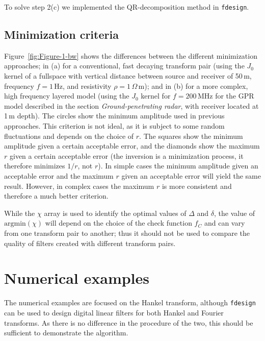 \documentclass[paper,twocolumn,twoside]{geophysics}
\newcommand{\mr}[1]{\mathrm{#1}}
\begin{document}
To solve step 2(c) we implemented the QR-decomposition method in
  \texttt{fdesign}.

\subsection{Minimization criteria}
Figure~\ref{fig:Figure-1-bw} shows the differences between the different
minimization approaches; in (a) for a conventional, fast decaying transform
pair (using the $J_0$ kernel of a fullspace with vertical distance between
source and receiver of 50\,m, frequency $f=1\,$Hz, and resistivity
$\rho=1\,\Omega\,$m); and in (b) for a more complex, high frequency layered
model (using the $J_0$ kernel for $f=200\,$MHz for the GPR model described
in the section \emph{Ground-penetrating radar}, with receiver located at 1\,m
depth). The circles show the minimum amplitude used in previous approaches.
This criterion is not ideal, as it is subject to some random fluctuations and
depends on the choice of $r$. The squares show the minimum amplitude given a
certain acceptable error, and the diamonds show the maximum $r$ given a certain
acceptable error (the inversion is a minimization process, it therefore
minimizes $1/r$, not $r$). In simple cases the minimum amplitude given an
acceptable error and the maximum $r$ given an acceptable error will yield the
same result. However, in complex cases the maximum $r$ is more consistent and
therefore a much better criterion.
%
%

While the $\chi$ array is used to identify the optimal values of $\Delta$ and
$\delta$, the value of $\mr{argmin}(\chi)$ will depend on the choice of the
check function $f_C$ and can vary from one transform pair to another; thus it
should not be used to compare the quality of filters created with different
transform pairs.


\section{Numerical examples}

The numerical examples are focused on the Hankel transform, although
\texttt{fdesign} can be used to design digital linear filters for both Hankel
and Fourier transforms. As there is no difference in the procedure of the two,
this should be sufficient to demonstrate the algorithm.
\end{document}
